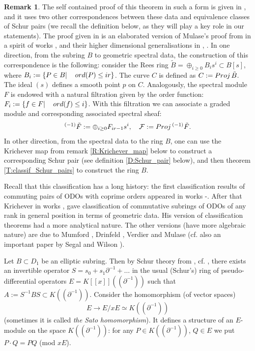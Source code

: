 \documentclass[11pt]{article}
\theoremstyle{definition}
\newcommand{\ord}{\mathop{\rm ord}\nolimits}
\newcommand{\Projj}{\mathop {\rm Proj}}
\newtheorem{rem}{Remark}[section]
\theoremstyle{plain}
\numberwithin{equation}{section}
\newcommand{\cf}{{{\cal F}}}
\begin{document}
\begin{rem}
\label{R:proof_explanations}
The self contained proof of this theorem in such a form is given in \cite[Ch. 9, 10]{Zheglov_book}, and it uses two other correspondences between these data and equivalence classes of Schur pairs (we recall the definition below, as they will play a key role in our statements). The proof given in \cite{Zheglov_book} is an elaborated version of Mulase's proof from \cite{Mu} in a spirit of works \cite{Parshin2001}, \cite{Os}  and their  higher dimensional generalisations in \cite{Zheglov2013}, \cite{KOZ2014}.  In one direction, from the subring $B$ to geometric spectral data, the construction of this correspondence is the following: consider the Rees ring $\tilde{B}=\oplus_{i\ge 0}B_{i}s^i\subset B[s]$, where $B_i:=\{P\in B |\quad \ord (P)\le ir\}$. The curve $C$ is defined as $C:=\Projj \tilde{B}$. The ideal $(s)$ defines a smooth point $p$ on $C$. Analogously, the spectral module $F$  is endowed with a natural filtration given by the order function: $F_i:=\{ f\in F| \quad \ord (f)\le i\}$. With this filtration we can associate a  graded module and corresponding associated spectral sheaf:  
$$
 {}^{(-1)}\tilde{F}:=\oplus_{i\ge 0}F_{ir-1}s^i, \quad \cf :=\Projj {}^{(-1)}\tilde{F}.
$$ 
In other direction, from the spectral data to the ring $B$, one can use the Krichever map from remark \ref{R:Krichever_map} below to construct a corresponding Schur pair (see definition \ref{D:Schur_pair} below), and then theorem \ref{T:classif_Schur_pairs} to construct the ring $B$.

Recall that this classification has a long history: the first classification results of commuting pairs of ODOs with coprime orders appeared in works \cite{BC1}-\cite{BC3}. After that Krichever in works \cite{Kr1}, \cite{Kr2} gave classification of commutative subrings of ODOs  of any rank in general position in terms of geometric data. His version of classification theorems had a more analytical nature. The other versions (have more algebraic nature) are due to Mumford \cite{Mumford_article}, Drinfeld \cite{Dr}, Verdier \cite{Verdier} and Mulase \cite{Mu} (cf. also an important paper by Segal and Wilson \cite{SW}). 
\end{rem}

Let $B\subset D_1$ be an elliptic subring. Then by Schur theory from \cite{Schur}, cf. \cite[T. 4.6, C. 4.7]{Zheglov_book}, there exists an invertible operator $S=s_0+s_1\partial^{-1} +\ldots $ in the usual (Schur's) ring of pseudo-differential operators $E=K[[x]]((\partial^{-1}))$ such that $A:=S^{-1}BS \subset K((\partial^{-1}))$. Consider the homomorphism (of vector spaces)
\begin{equation}
\label{E:Sato_hom}
E\rightarrow E/xE \simeq K((\partial^{-1}))
\end{equation}
(sometimes it is called {\it the Sato homomorphism}). It defines a structure of an $E$-module on the space  $K((\partial^{-1}))$: for any $P\in K((\partial^{-1}))$, $Q\in E$ we put  $P\cdot Q= PQ$ (mod $xE$). 
\end{document}
